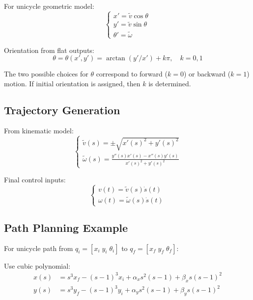 \documentclass[openany]{book}
\theoremstyle{definition}
\theoremstyle{remark}
\newcommand{\note}[1]{
\begin{tcolorbox}[colback=green!5,colframe=green!40!black,title=Note]
 #1
\end{tcolorbox}
}
\begin{document}
For unicycle geometric model:
\begin{equation}
    \begin{cases}
        x' = \tilde{v}\cos \theta \\
        y' = \tilde{v}\sin \theta \\
        \theta' = \tilde{\omega}
    \end{cases}
\end{equation}

Orientation from flat outputs:
\begin{equation}
    \theta = \theta(x', y') = \arctan(y'/x') + k\pi, \quad k = 0,1
\end{equation}

\note{The two possible choices for $\theta$ correspond to forward ($k=0$) or backward ($k=1$) motion. If initial orientation is assigned, then $k$ is determined.}

\subsection{Trajectory Generation}
From kinematic model:
\begin{equation}
    \begin{cases}
        \tilde{v}(s) = \pm\sqrt{x'(s)^2 + y'(s)^2} \\
        \tilde{\omega}(s) = \frac{y''(s)x'(s) - x''(s)y'(s)}{x'(s)^2 + y'(s)^2}
    \end{cases}
\end{equation}

Final control inputs:
\begin{equation}
    \begin{cases}
        v(t) = \tilde{v}(s)\dot{s}(t) \\
        \omega(t) = \tilde{\omega}(s)\dot{s}(t)
    \end{cases}
\end{equation}

\subsection{Path Planning Example}
For unicycle path from $q_i = [x_i \; y_i \; \theta_i]$ to $q_f = [x_f \; y_f \; \theta_f]$:

Use cubic polynomial:
\begin{equation}
    \begin{aligned}
        x(s) &= s^3x_f - (s-1)^3x_i + \alpha_x s^2(s-1) + \beta_x s(s-1)^2 \\
        y(s) &= s^3y_f - (s-1)^3y_i + \alpha_y s^2(s-1) + \beta_y s(s-1)^2
    \end{aligned}
\end{equation}
\end{document}
